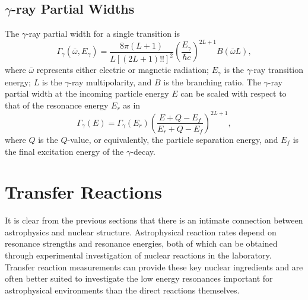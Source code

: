 \subsection{$\gamma$-ray Partial Widths}
The $\gamma$-ray partial width for a single transition is
\begin{equation}
\Gamma_{\gamma}(\bar{\omega}, E_{\gamma}) = \frac{8 \pi (L + 1)}{L\left[(2L + 1)!!\right]^{2}} \left(\frac{E_{\gamma}}{\hbar c}\right)^{2L+1} B(\bar{\omega}L),
\end{equation}
where $\bar{\omega}$ represents either electric or magnetic radiation; $E_{\gamma}$ is the $\gamma$-ray transition energy; $L$ is the $\gamma$-ray multipolarity, and $B$ is the branching ratio. The $\gamma$-ray partial width at the incoming particle energy $E$ can be scaled with respect to that of the resonance energy $E_{r}$ as in
\begin{equation}
\Gamma_{\gamma}(E) = \Gamma_{\gamma}(E_{r}) \left(\frac{E + Q - E_{f}}{E_{r} + Q - E_{f}}\right)^{2L+1},
\end{equation}
where $Q$ is the $Q$-value, or equivalently, the particle separation energy, and $E_{f}$ is the final excitation energy of the $\gamma$-decay.

\section{Transfer Reactions} \label{sec:transfer_reactions}



It is clear from the previous sections that there is an intimate connection between astrophysics and nuclear structure. Astrophysical reaction rates depend on resonance strengths and resonance energies, both of which can be obtained through experimental investigation of nuclear reactions in the laboratory. Transfer reaction measurements can provide these key nuclear ingredients and are often better suited to investigate the low energy resonances important for astrophysical environments than the direct reactions themselves. %

